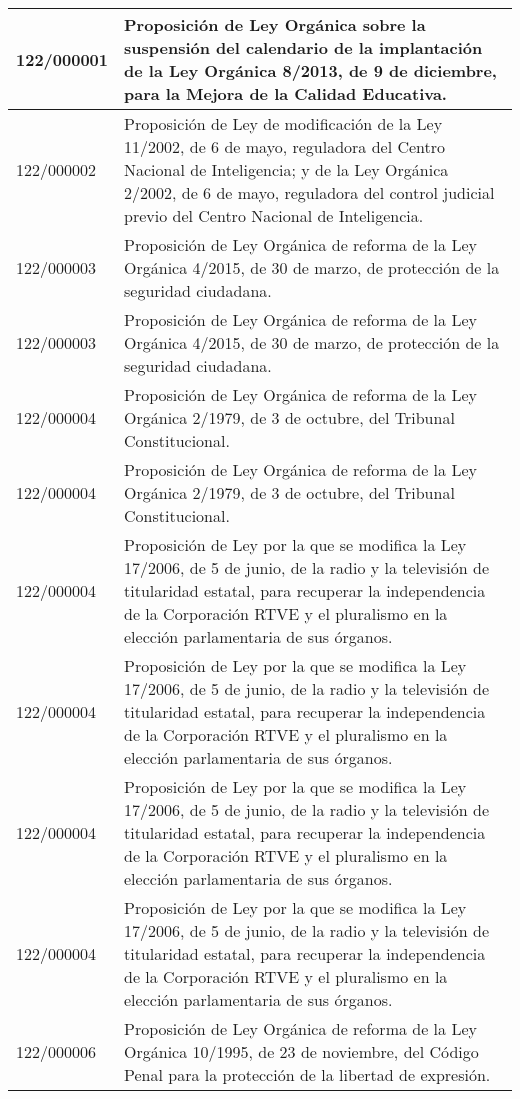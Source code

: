 {\begin{table}[H]
\begin{center}
\begin{tabularx}{\linewidth}{| l | X |}
\hline
122/000001 & Proposición de Ley Orgánica sobre la suspensión del calendario de la implantación de la Ley Orgánica 8/2013, de 9 de diciembre, para la Mejora de la Calidad Educativa. \\
\hline
122/000002 & Proposición de Ley de modificación de la Ley 11/2002, de 6 de mayo, reguladora del Centro Nacional de Inteligencia; y de la Ley Orgánica 2/2002, de 6 de mayo, reguladora del control judicial previo del Centro Nacional de Inteligencia. \\
\hline
122/000003 & Proposición de Ley Orgánica de reforma de la Ley Orgánica 4/2015, de 30 de marzo, de protección de la seguridad ciudadana. \\
\hline
122/000003 & Proposición de Ley Orgánica de reforma de la Ley Orgánica 4/2015, de 30 de marzo, de protección de la seguridad ciudadana. \\
\hline
122/000004 & Proposición de Ley Orgánica de reforma de la Ley Orgánica 2/1979, de 3 de octubre, del Tribunal Constitucional. \\
\hline
122/000004 & Proposición de Ley Orgánica de reforma de la Ley Orgánica 2/1979, de 3 de octubre, del Tribunal Constitucional. \\
\hline
122/000004 & Proposición de Ley por la que se modifica la Ley 17/2006, de 5 de junio, de la radio y la televisión de titularidad estatal, para recuperar la independencia de la Corporación RTVE y el pluralismo en la elección parlamentaria de sus órganos. \\
\hline
122/000004 & Proposición de Ley por la que se modifica la Ley 17/2006, de 5 de junio, de la radio y la televisión de titularidad estatal, para recuperar la independencia de la Corporación RTVE y el pluralismo en la elección parlamentaria de sus órganos. \\
\hline
122/000004 & Proposición de Ley por la que se modifica la Ley 17/2006, de 5 de junio, de la radio y la televisión de titularidad estatal, para recuperar la independencia de la Corporación RTVE y el pluralismo en la elección parlamentaria de sus órganos. \\
\hline
122/000004 & Proposición de Ley por la que se modifica la Ley 17/2006, de 5 de junio, de la radio y la televisión de titularidad estatal, para recuperar la independencia de la Corporación RTVE y el pluralismo en la elección parlamentaria de sus órganos. \\
\hline
122/000006 & Proposición de Ley Orgánica de reforma de la Ley Orgánica 10/1995, de 23 de noviembre, del Código Penal para la protección de la libertad de expresión. \\

\end{tabularx}
\end{center}
\end{table}}
